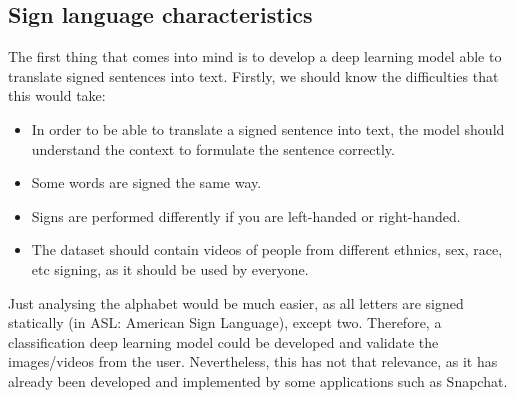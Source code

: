 \subsection{Sign language characteristics}
The first thing that comes into mind is to develop a deep learning model able to translate signed sentences into 
text. Firstly, we should know the difficulties that this would take:
\begin{itemize}
    \item In order to be able to translate a signed sentence into text, the model should understand the context to formulate the sentence correctly.
    \item Some words are signed the same way.
    \item Signs are performed differently if you are left-handed or right-handed.
    \item The dataset should contain videos of people from different ethnics, sex, race, etc signing, as it should be used by everyone.
\end{itemize}

Just analysing the alphabet would be much easier, as all letters are signed statically (in ASL: American Sign Language), except two.
Therefore, a classification deep learning model could be developed and validate the images/videos from the user.
Nevertheless, this has not that relevance, as it has already been developed and implemented by some applications such as Snapchat.

